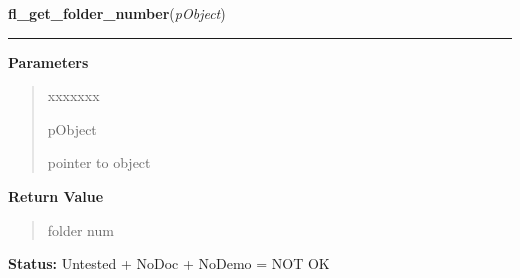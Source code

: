 \hspace{.8\funcindent}\begin{boxedminipage}{\funcwidth}

    \raggedright \textbf{fl\_get\_folder\_number}(\textit{pObject})

    \vspace{-1.5ex}

    \rule{\textwidth}{0.5\fboxrule}
\setlength{\parskip}{2ex}
\setlength{\parskip}{1ex}
      \textbf{Parameters}
      \vspace{-1ex}

      \begin{quote}
        \begin{Ventry}{xxxxxxx}

          \item[pObject]

          pointer to object

        \end{Ventry}

      \end{quote}

      \textbf{Return Value}
    \vspace{-1ex}

      \begin{quote}
      folder num

      \end{quote}

\textbf{Status:} Untested + NoDoc + NoDemo = NOT OK



    \end{boxedminipage}

    \label{xformslib:library:fl_get_folder_name}

    \vspace{0.5ex}

